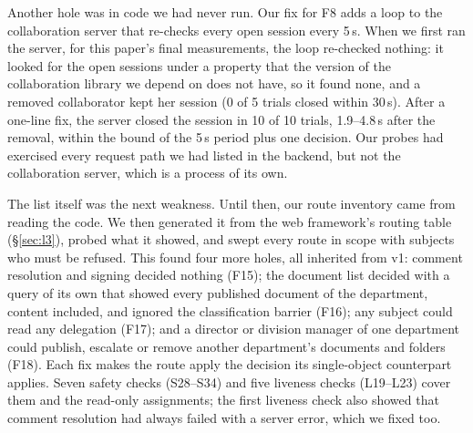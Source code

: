 \documentclass[sigconf,review,anonymous]{acmart}
\begin{document}
Another hole was in code we had never run. Our fix for F8 adds a loop to the collaboration server that
re-checks every open session every 5\,s. When we first ran the server, for this paper's final measurements, the
loop re-checked nothing: it looked for the open sessions under a property that the version of the
collaboration library we depend on does not have, so it found none, and a removed collaborator kept her session
(0 of 5 trials closed within 30\,s). After a one-line fix, the server closed the session in 10 of 10 trials,
1.9--4.8\,s after the removal, within the bound of the 5\,s period plus one decision. Our probes had exercised
every request path we had listed in the backend, but not the collaboration server, which is a process of its own.

The list itself was the next weakness. Until then, our route inventory came from reading the code. We then
generated it from the web framework's routing table (\S\ref{sec:l3}), probed what it showed, and swept every
route in scope with subjects who must be refused. This found four more holes, all inherited from v1: comment
resolution and signing decided nothing (F15); the document list decided with a query of its own that showed
every published document of the department, content included, and ignored the classification barrier (F16);
any subject could read any delegation (F17); and a director or division manager of one department could
publish, escalate or remove another department's documents and folders (F18). Each fix makes the route apply
the decision its single-object counterpart applies. Seven safety checks (S28--S34) and five liveness checks
(L19--L23) cover them and the read-only assignments; the first liveness check also showed that comment
resolution had always failed with a server error, which we fixed too.
\end{document}
